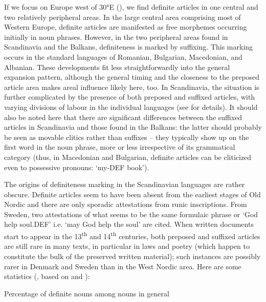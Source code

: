 If we focus on Europe west of 30°E (), we find definite articles in one central and two relatively peripheral areas. In the large central area comprising most of Western Europe, definite articles are manifested as free morphemes occurring initially in noun phrases. However, in the two peripheral areas found in Scandinavia and the Balkans, definiteness is marked by suffixing.  This marking occurs in the standard languages of Romanian, Bulgarian, Macedonian, and Albanian. These developments fit less straightforwardly into the general expansion pattern, although the general timing and the closeness to the preposed article area makes areal influence likely here, too. In Scandinavia, the situation is further complicated by the presence of both preposed and suffixed articles, with varying divisions of labour in the individual languages (see  for details). It should also be noted here that there are significant differences between the suffixed articles in Scandinavia and those found in the Balkans: the latter should probably be seen as movable clitics rather than suffixes – they typically show up on the first word in the noun phrase, more or less irrespective of its grammatical category (thus, in Macedonian and Bulgarian, definite articles can be cliticized even to possessive pronouns:  ‘my-DEF book’). 

The origins of definiteness marking in the Scandinavian languages are rather obscure. Definite articles seem to have been absent from the earliest stages of Old Nordic and there are only sporadic attestations from runic inscriptions. From Sweden, two attestations of what seems to be the same formulaic phrase or ‘God help soul.DEF’ i.e. ‘may God help the soul’ are cited. When written documents start to appear in the 13\textsuperscript{th} and 14\textsuperscript{th} centuries, both preposed and suffixed articles are still rare in many texts, in particular in laws and poetry (which happen to constitute the bulk of the preserved written material); such instances are possibly rarer in Denmark and Sweden than in the West Nordic area. Here are some statistics (\citet[938]{Delsing2002}, based on \citet{Larm1936} and \citet{Skautrup1944}): 

\begin{table}
\caption{ Percentage of definite nouns among nouns in general}
\label{tab:1}
\end{table}

